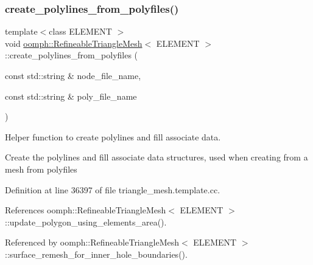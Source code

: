 \mbox{\label{classoomph_1_1RefineableTriangleMesh_aeae7ba7543ed8e97d32c7c688da48521}} 
\subsubsection{\texorpdfstring{create\+\_\+polylines\+\_\+from\+\_\+polyfiles()}{create\_polylines\_from\_polyfiles()}}
{\footnotesize\ttfamily template$<$class E\+L\+E\+M\+E\+NT $>$ \\
void \hyperlink{classoomph_1_1RefineableTriangleMesh}{oomph\+::\+Refineable\+Triangle\+Mesh}$<$ E\+L\+E\+M\+E\+NT $>$\+::create\+\_\+polylines\+\_\+from\+\_\+polyfiles (\begin{DoxyParamCaption}\item[{const std\+::string \&}]{node\+\_\+file\+\_\+name,  }\item[{const std\+::string \&}]{poly\+\_\+file\+\_\+name }\end{DoxyParamCaption})}



Helper function to create polylines and fill associate data. 

Create the polylines and fill associate data structures, used when creating from a mesh from polyfiles 

Definition at line 36397 of file triangle\+\_\+mesh.\+template.\+cc.



References oomph\+::\+Refineable\+Triangle\+Mesh$<$ E\+L\+E\+M\+E\+N\+T $>$\+::update\+\_\+polygon\+\_\+using\+\_\+elements\+\_\+area().



Referenced by oomph\+::\+Refineable\+Triangle\+Mesh$<$ E\+L\+E\+M\+E\+N\+T $>$\+::surface\+\_\+remesh\+\_\+for\+\_\+inner\+\_\+hole\+\_\+boundaries().

\mbox{\label{classoomph_1_1RefineableTriangleMesh_a8ad12ebe7625ff189c1f7beb1eabff04}} 
